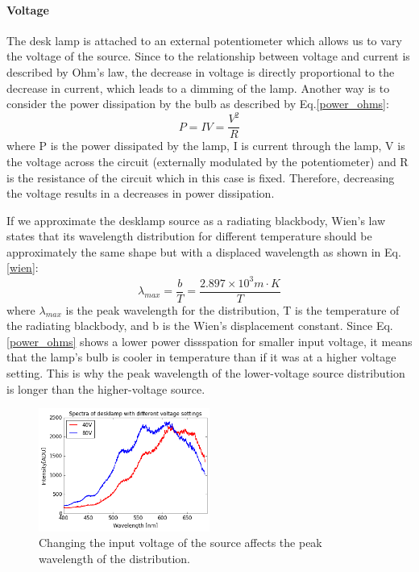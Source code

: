 \documentclass[authoryear, 12pt,5p, times]{elsarticle}
\begin{document}
	\paragraph*{\textbf{Voltage}} The desk lamp is attached to an external potentiometer which allows us to vary the voltage of the source. Since to the relationship between voltage and current is described by Ohm's law, the decrease in voltage is directly proportional to the decrease in current, which  leads to a dimming of the lamp. Another way is to consider the power dissipation by the bulb as described by Eq.\ref{power_ohms}:
	\begin{equation}
	P=IV=\frac{V^2}{R}
	\label{power_ohms}
	\end{equation}
		where P is the power dissipated by the lamp, I is current through the lamp, V is the voltage across the circuit (externally modulated by the potentiometer) and R is the resistance of the circuit which in this case is fixed. Therefore, decreasing the voltage results in a decreases in power dissipation.
		
If we approximate the desklamp source as a radiating blackbody, Wien's law states that its wavelength distribution for different temperature should be approximately the same shape but with a displaced wavelength as shown in Eq.\ref{wien}:
		\begin{equation}
		\lambda_{max} = \frac{b}{T}=\frac{2.897\times 10^3 m\cdot K}{T}
		\label{wien}
		\end{equation}
		where $\lambda_{max}$ is the peak wavelength for the distribution, T is the temperature of the radiating blackbody, and b is the Wien's displacement constant.
		Since Eq. \ref{power_ohms} shows a lower power dissspation for smaller input voltage, it means that the lamp's bulb is cooler in temperature than if it was at a higher voltage setting. This is why the peak wavelength of the  lower-voltage source distribution is longer than the higher-voltage source. %
	\begin{figure}[h!]
	\includegraphics[width=0.5\textwidth]{figures/voltage}
\caption{Changing the input voltage of the source affects the peak wavelength of the distribution. }

\label{voltage}
	\end{figure}
\end{document}
